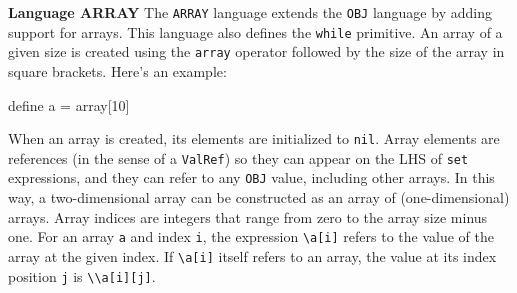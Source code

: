 \begin{minipage}[t]{\sw}
\slidenumber
\LARGE
{\bf Language ARRAY}\exx
The \verb'ARRAY' language extends the \verb'OBJ' language
by adding support for arrays.
This language also defines the \verb'while' primitive.
An array of a given size is created using the \verb'array' operator
followed by the size of the array in square brackets.
Here's an example:
\begin{qv}
define a = array[10]
\end{qv}
When an array is created, its elements are initialized to \verb'nil'.
Array elements are references (in the sense of a \verb'ValRef')
so they can appear on the LHS of \verb'set' expressions,
and they can refer to any \verb'OBJ' value, including other arrays.
In this way, a two-dimensional array can be constructed
as an array of (one-dimensional) arrays.\exx
Array indices are integers that range from zero to the array size minus one.
For an array \verb'a' and index \verb'i',
the expression \verb'\a[i]' refers to the value
of the array at the given index.
If \verb'\a[i]' itself refers to an array,
the value at its index position \verb'j' is \verb'\\a[i][j]'.\exx
\end{minipage}
